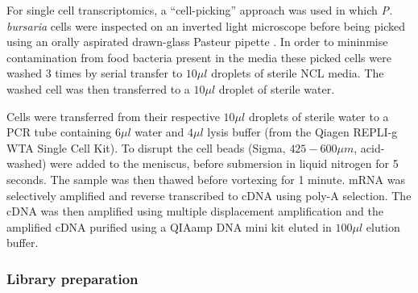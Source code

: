 For single cell transcriptomics, a ``cell-picking'' approach was used in which
\textit{P. bursaria} cells were inspected on an inverted light microscope before being picked
using an orally aspirated drawn-glass Pasteur pipette \citep{Garcia-Cuetos2012}.
In order to mininmise contamination from food bacteria present in the media these picked cells
were washed 3 times by serial transfer to \(10\mu l\) droplets of sterile NCL media.
The washed cell was then transferred to a \(10\mu l\) droplet of sterile water.

Cells were transferred from their respective \(10\mu l\) droplets of sterile water to
a PCR tube containing \(6\mu l\) water and \(4\mu l \) lysis buffer (from the Qiagen
REPLI-g WTA Single Cell Kit). To disrupt the cell beads (Sigma, \(425-600\mu m\), acid-washed)
were added to the meniscus, before submersion in liquid nitrogen for 5 seconds.  The sample was 
then thawed before vortexing for 1 minute.  
mRNA was selectively amplified and reverse transcribed to cDNA using poly-A selection.  The cDNA
was then amplified using multiple displacement amplification and the amplified cDNA purified
using a QIAamp DNA mini kit eluted in \(100\mu l\) elution buffer.


\subsubsection{Library preparation}

